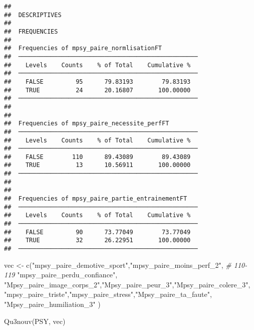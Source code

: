 \documentclass[
]{article}
\newenvironment{Shaded}{\begin{snugshade}}{\end{snugshade}}
\newcommand{\CommentTok}[1]{\textcolor[rgb]{0.56,0.35,0.01}{\textit{#1}}}
\newcommand{\FunctionTok}[1]{\textcolor[rgb]{0.00,0.00,0.00}{#1}}
\newcommand{\NormalTok}[1]{#1}
\newcommand{\OtherTok}[1]{\textcolor[rgb]{0.56,0.35,0.01}{#1}}
\newcommand{\StringTok}[1]{\textcolor[rgb]{0.31,0.60,0.02}{#1}}
\begin{document}
\begin{verbatim}
## 
##  DESCRIPTIVES
## 
##  FREQUENCIES
## 
##  Frequencies of mpsy_paire_normlisationFT           
##  ────────────────────────────────────────────────── 
##    Levels    Counts    % of Total    Cumulative %   
##  ────────────────────────────────────────────────── 
##    FALSE         95      79.83193        79.83193   
##    TRUE          24      20.16807       100.00000   
##  ────────────────────────────────────────────────── 
## 
## 
##  Frequencies of mpsy_paire_necessite_perfFT         
##  ────────────────────────────────────────────────── 
##    Levels    Counts    % of Total    Cumulative %   
##  ────────────────────────────────────────────────── 
##    FALSE        110      89.43089        89.43089   
##    TRUE          13      10.56911       100.00000   
##  ────────────────────────────────────────────────── 
## 
## 
##  Frequencies of mpsy_paire_partie_entrainementFT    
##  ────────────────────────────────────────────────── 
##    Levels    Counts    % of Total    Cumulative %   
##  ────────────────────────────────────────────────── 
##    FALSE         90      73.77049        73.77049   
##    TRUE          32      26.22951       100.00000   
##  ──────────────────────────────────────────────────
\end{verbatim}

\begin{Shaded}
\begin{Highlighting}[]
\NormalTok{vec }\OtherTok{\textless{}{-}} \FunctionTok{c}\NormalTok{(}\StringTok{"mpsy\_paire\_demotive\_sport"}\NormalTok{,}\StringTok{"mpsy\_paire\_moins\_perf\_2"}\NormalTok{,  }\CommentTok{\# 110{-}119}
         \StringTok{"mpsy\_paire\_perdu\_confiance"}\NormalTok{,  }
    \StringTok{"Mpsy\_paire\_image\_corps\_2"}\NormalTok{,}\StringTok{"Mpsy\_paire\_peur\_3"}\NormalTok{,}\StringTok{"Mpsy\_paire\_colere\_3"}\NormalTok{,}
    \StringTok{"mpsy\_paire\_triste"}\NormalTok{,}\StringTok{"mpsy\_paire\_stress"}\NormalTok{,}\StringTok{"Mpsy\_paire\_ta\_faute"}\NormalTok{,}
    \StringTok{"Mpsy\_paire\_humiliation\_3"}
\NormalTok{     )}

\FunctionTok{Qu3nouv}\NormalTok{(PSY, vec)}
\end{Highlighting}
\end{Shaded}
\end{document}
